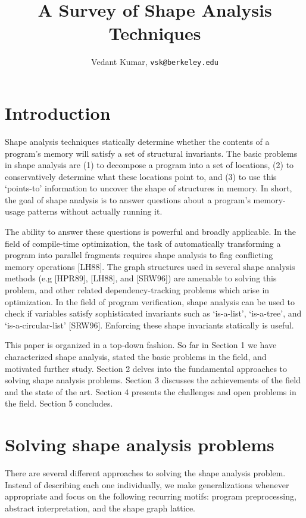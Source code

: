 \documentclass{article}
\title{A Survey of Shape Analysis Techniques}
\author{Vedant Kumar, \texttt{vsk@berkeley.edu}}
\begin{document}
\maketitle

\section{Introduction}

Shape analysis techniques statically determine whether the contents of a
program's memory will satisfy a set of structural invariants. The basic
problems in shape analysis are (1) to decompose a program into a set of
locations, (2) to conservatively determine what these locations point to,
and (3) to use this `points-to' information to uncover the shape of
structures in memory. In short, the goal of shape analysis is to answer
questions about a program's memory-usage patterns without actually running 
it.

The ability to answer these questions is powerful and broadly applicable. In
the field of compile-time optimization, the task of automatically
transforming a program into parallel fragments requires shape analysis to
flag conflicting memory operations [LH88]. The graph structures used in
several shape analysis methods (e.g [HPR89], [LH88], and [SRW96]) are
amenable to solving this problem, and other related dependency-tracking
problems which arise in optimization. In the field of program verification,
shape analysis can be used to check if variables satisfy sophisticated
invariants such as `is-a-list', `is-a-tree', and `is-a-circular-list'
[SRW96]. Enforcing these shape invariants statically is useful.

This paper is organized in a top-down fashion. So far in Section 1 we have
characterized shape analysis, stated the basic problems in the field, and
motivated further study. Section 2 delves into the fundamental approaches to
solving shape analysis problems. Section 3 discusses the achievements of the
field and the state of the art. Section 4 presents the challenges and open
problems in the field. Section 5 concludes.

\section{Solving shape analysis problems}

There are several different approaches to solving the shape analysis
problem. Instead of describing each one individually, we make
generalizations whenever appropriate and focus on the following recurring
motifs: program preprocessing, abstract interpretation, and the shape graph
lattice.
\end{document}
